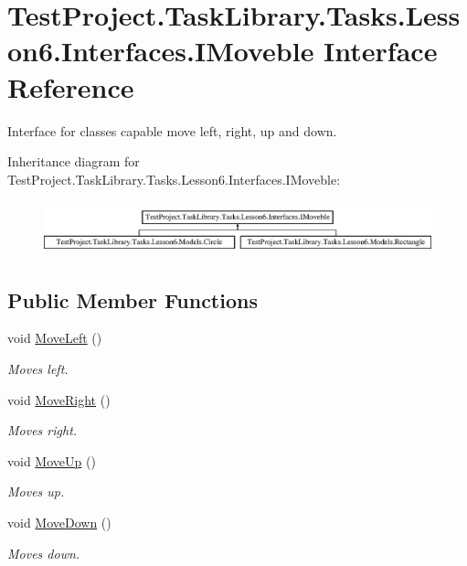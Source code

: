 \hypertarget{interface_test_project_1_1_task_library_1_1_tasks_1_1_lesson6_1_1_interfaces_1_1_i_moveble}{}\section{Test\+Project.\+Task\+Library.\+Tasks.\+Lesson6.\+Interfaces.\+I\+Moveble Interface Reference}
\label{interface_test_project_1_1_task_library_1_1_tasks_1_1_lesson6_1_1_interfaces_1_1_i_moveble}


Interface for classes capable move left, right, up and down.  


Inheritance diagram for Test\+Project.\+Task\+Library.\+Tasks.\+Lesson6.\+Interfaces.\+I\+Moveble\+:\begin{figure}[H]
\begin{center}
\leavevmode
\includegraphics[height=1.568627cm]{interface_test_project_1_1_task_library_1_1_tasks_1_1_lesson6_1_1_interfaces_1_1_i_moveble}
\end{center}
\end{figure}
\subsection*{Public Member Functions}
\begin{DoxyCompactItemize}
\item 
void \mbox{\hyperlink{interface_test_project_1_1_task_library_1_1_tasks_1_1_lesson6_1_1_interfaces_1_1_i_moveble_a277cd113ed9b4f35228f1c84bb17e91e}{Move\+Left}} ()
\begin{DoxyCompactList}\small\item\em Moves left. \end{DoxyCompactList}\item 
void \mbox{\hyperlink{interface_test_project_1_1_task_library_1_1_tasks_1_1_lesson6_1_1_interfaces_1_1_i_moveble_a1e6b39ff1e153b383e081f991501e742}{Move\+Right}} ()
\begin{DoxyCompactList}\small\item\em Moves right. \end{DoxyCompactList}\item 
void \mbox{\hyperlink{interface_test_project_1_1_task_library_1_1_tasks_1_1_lesson6_1_1_interfaces_1_1_i_moveble_a2be55236c78ebdcac42f22d31abdf18e}{Move\+Up}} ()
\begin{DoxyCompactList}\small\item\em Moves up. \end{DoxyCompactList}\item 
void \mbox{\hyperlink{interface_test_project_1_1_task_library_1_1_tasks_1_1_lesson6_1_1_interfaces_1_1_i_moveble_a23443cd54657cc981a48ef7f9904185d}{Move\+Down}} ()
\begin{DoxyCompactList}\small\item\em Moves down. \end{DoxyCompactList}\end{DoxyCompactItemize}


